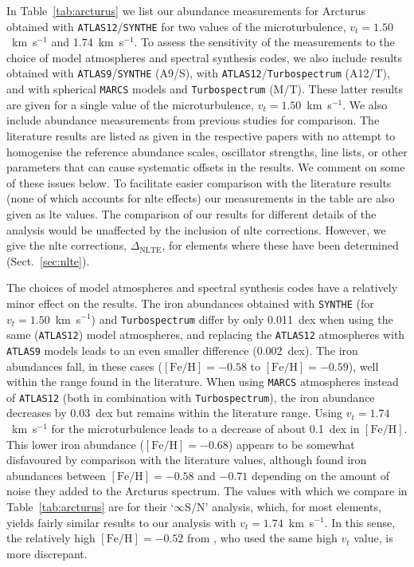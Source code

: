 \documentclass{aa}
\begin{document}
In Table~\ref{tab:arcturus} we list our abundance measurements for Arcturus obtained with \texttt{ATLAS12}/\texttt{SYNTHE} for two values of the microturbulence, $v_t=1.50$~km~s$^{-1}$ and 1.74~km~s$^{-1}$. To assess the sensitivity of the measurements to the choice of model atmospheres and spectral synthesis codes, we also include results obtained with \texttt{ATLAS9}/\texttt{SYNTHE} (A9/S), with \texttt{ATLAS12}/\texttt{Turbospectrum} (A12/T), and with spherical \texttt{MARCS} models and \texttt{Turbospectrum} (M/T). These latter results are given for a single value of the microturbulence, $v_t=1.50$~km~s$^{-1}$. 
We also include abundance measurements from previous studies for comparison.
The literature results are listed as given in the respective papers with no attempt to homogenise the reference abundance scales, oscillator strengths, line lists, or other parameters that can cause systematic offsets in the results.  We comment on some of these issues below. 
To facilitate easier comparison with the literature results (none of which accounts for \ac{nlte} effects) our measurements in the table are also given as \ac{lte} values.
The comparison of our results for different details of the analysis would be unaffected by the inclusion of \ac{nlte} corrections. However, we give the \ac{nlte} corrections, $\Delta_\mathrm{NLTE}$, for elements where these have been determined (Sect.~\ref{sec:nlte}).

The choices of model atmospheres and spectral synthesis codes have a relatively minor effect on the results. The iron abundances obtained with \texttt{SYNTHE}  (for $v_t=1.50$~km~s$^{-1}$)
and \texttt{Turbospectrum} differ by only 0.011~dex when using the same (\texttt{ATLAS12}) model atmospheres, and replacing the \texttt{ATLAS12} atmospheres with \texttt{ATLAS9} models leads to an even smaller difference (0.002~dex). 
The iron abundances fall, in these cases ($\mathrm{[Fe/H]}=-0.58$ to $\mathrm{[Fe/H]}=-0.59$), well within the range found in the literature. 
When using \texttt{MARCS} atmospheres instead of \texttt{ATLAS12} (both in combination with \texttt{Turbospectrum}), the iron abundance decreases by 0.03~dex but remains within the literature range. Using $v_t=1.74$~km~s$^{-1}$ for the microturbulence leads to a decrease of about 0.1~dex in $\mathrm{[Fe/H]}$. This lower iron abundance ($\mathrm{[Fe/H]}=-0.68$) appears to be somewhat disfavoured by comparison with the literature values, although  found iron abundances between $\mathrm{[Fe/H]}=-0.58$ and $-0.71$ depending on the amount of noise they added to the Arcturus spectrum. The values with which we compare in Table~\ref{tab:arcturus} are for their `$\infty$S/N' analysis, which, for most elements, yields fairly similar results to our analysis with $v_t=1.74$~km~s$^{-1}$. In this sense, the relatively high $\mathrm{[Fe/H]}=-0.52$ from , who used the same high $v_t$ value, is more discrepant. 
\end{document}

